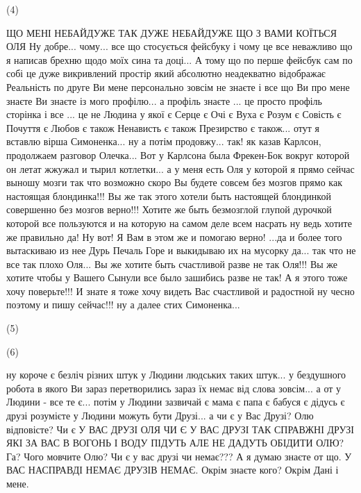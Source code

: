 (4)

ЩО МЕНІ НЕБАЙДУЖЕ ТАК ДУЖЕ НЕБАЙДУЖЕ ЩО З ВАМИ КОЇТЬСЯ ОЛЯ Ну добре... чому...
все що стосується фейсбуку і чому це все неважливо що я написав брехню щодо
моїх сина та доці... А тому що по перше фейсбук сам по собі це дуже викривлений
простір який абсолютно неадекватно відображає Реальність по друге Ви мене
персонально зовсім не знаєте і все що Ви про мене знаєте Ви знаєте із мого
профілю... а профіль знаєте ... це просто профіль сторінка і все ...  це не
Людина у якої є Серце є Очі є Вуха є Розум є Совість є Почуття є Любов є також
Ненависть є також Презирство є також... отут я вставлю вірша Симоненка... ну а
потім продовжу... так!  як казав Карлсон, продолжаем разговор Олечка... Вот у
Карлсона была Фрекен-Бок вокруг которой он летат жжужал и тырил котлетки... а у
меня есть Оля у которой я прямо сейчас выношу мозги так что возможно скоро Вы
будете совсем без мозгов прямо как настоящая блондинка!!! Вы же так этого
хотели быть настоящей блондинкой совершенно без мозгов верно!!! Хотите же быть
безмозглой глупой дурочкой которой все пользуются и на которую на самом деле
всем насрать ну ведь хотите же правильно да! Ну вот! Я Вам в этом же и помогаю
верно!  ...да и более того вытаскиваю из нее Дурь Печаль Горе и выкидываю их на
мусорку да... так что не все так плохо Оля... Вы же хотите быть счастливой
разве не так Оля!!! Вы же хотите чтобы у Вашего Сынули все было зашибись разве
не так! А я этого тоже хочу поверьте!!!  И знате я тоже хочу видеть Вас
счастливой и радостной ну чесно поэтому и пишу сейчас!!! ну а далее стих
Симоненка...

(5)



(6)

ну короче є безліч різних штук у Людини людських таких штук... у бездушного
робота в якого Ви зараз перетворились зараз їх немає від слова зовсім... а от у
Людини - все те є...  потім у Людини зазвичай є мама є папа є бабуся є дідусь є
друзі розумієте у Людини можуть бути Друзі... а чи є у Вас Друзі? Олю
відповісте?  Чи є У ВАС ДРУЗІ ОЛЯ ЧИ Є У ВАС ДРУЗІ ТАК СПРАВЖНІ ДРУЗІ ЯКІ ЗА
ВАС В ВОГОНЬ І ВОДУ ПІДУТЬ АЛЕ НЕ ДАДУТЬ ОБІДИТИ ОЛЮ? Га? Чого мовчите Олю? Чи
є у вас друзі чи немає??? А я думаю знаєте от що.  У ВАС НАСПРАВДІ НЕМАЄ ДРУЗІВ
НЕМАЄ. Окрім знаєте кого? Окрім Дані і мене.  




